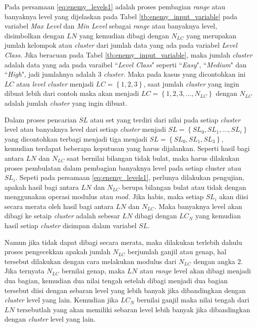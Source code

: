 Pada persamaan \ref{eq:enemy_levels1} adalah proses pembagian \textit{range} atau banyaknya level yang dijelaskan pada Tabel \ref{tb:enemy_input_variable} pada variabel \textit{Max Level} dan \textit{Min Level} sebagai \textit{range} atau banyaknya level, disimbolkan dengan $LN$ yang kemudian dibagi dengan $N_{LC}$ yang merupakan jumlah kelompok atau \textit{cluster} dari jumlah data yang ada pada variabel \textit{Level Class}. Jika beracuan pada Tabel \ref{tb:enemy_input_variable}, maka jumlah \textit{cluster} adalah data yang ada pada varaibel ``\textit{Level Class}" seperti ``\textit{Easy}", ``\textit{Medium}" dan ``\textit{High}", jadi jumlahnya adalah 3 \textit{cluster}. Maka pada kasus yang dicontohkan ini $LC$ atau \textit{level cluster} menjadi $LC = \left \{1, 2, 3 \right \}$, saat jumlah \textit{cluster} yang ingin dibuat lebih dari contoh maka akan menjadi $LC = \left \{1, 2, 3,..., N_{LC} \right \}$ dengan $N_{LC}$ adalah jumlah \textit{cluster} yang ingin dibuat.
\vspace{1ex}

Dalam proses pencarian $SL$ atau set yang terdiri dari nilai pada setiap \textit{cluster} level atau banyaknya level dari setiap \textit{cluster} menjadi $SL = \left \{SL_{0}, SL_{1},... , SL_{i} \right\}$ yang dicontohkan terbagi menjadi tiga menjadi $SL = \left \{SL_{0}, SL_{1}, SL_{3} \right \}$, kemudian terdapat beberapa keputusan yang harus dijalankan. Seperti hasil bagi antara $LN$ dan $N_{LC}$ saat bernilai bilangan tidak bulat, maka harus dilakukan proses pembulatan dalam pembagian banyaknya level pada setiap cluster atau $SL_{i}$. Sepeti pada persamaan \ref{eq:enemy_levels1}, perlunya dilakukan pengujian, apakah hasil bagi antara $LN$ dan $N_{LC}$ berupa bilangan bulat atau tidak dengan menggunakan operasi modulus atau $mod$. Jika habis, maka setiap $SL_{i}$ akan diisi secara merata oleh hasil bagi antara $LN$ dan $N_{LC}$. Maka banyaknya level akan dibagi ke setaip \textit{cluster} adalah sebesar $LN$ dibagi dengan $LC_{N}$ yang kemudian hasil setiap \textit{cluster} disimpan dalam variabel $SL$.
\vspace{1ex}

Namun jika tidak dapat dibagi secara merata, maka dilakukan terlebih dahulu proses pengecekkan apakah jumlah $N_{LC}$ berjumlah ganjil atau genap, hal tersebut dilakukan dengan cara melakukan modulus dari $N_{LC}$ dengan angka 2. Jika ternyata $N_{LC}$ bernilai genap, maka $LN$ atau \textit{range} level akan dibagi menjadi dua bagian, kemudian dua nilai tengah setelah dibagi menjadi dua bagian tersebut diisi dengan sebaran level yang lebih banyak jika dibandingkan dengan \textit{cluster} level yang lain. Kemudian jika $LC_{N}$ bernilai ganjil maka nilai tengah dari $LN$ tersebutlah yang akan memiliki sebaran level lebih banyak jika dibandingkan dengan \textit{cluster} level yang lain.
\vspace{1ex}

